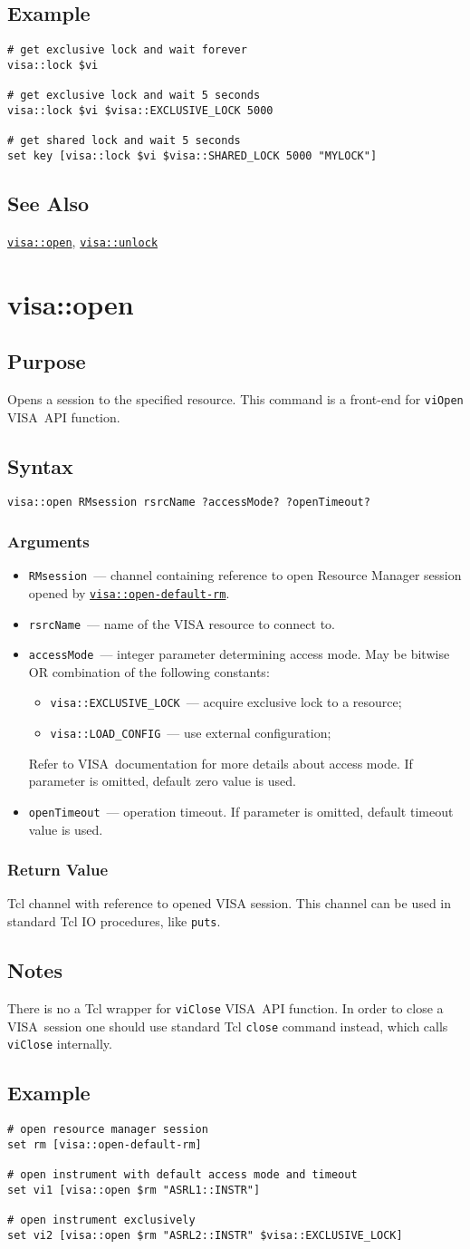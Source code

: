 \documentclass[12pt, a4paper]{report}
\newcommand{\VISA}{\mbox{VISA }}
\newcommand{\COMMANDREF}[1]{{\tt \hyperref[#1]{#1}}}
\newcommand{\VISACOMMANDREF}[1]{{\tt \mbox{#1}}\index{#1}}
\newcommand{\TCLCOMMANDREF}[1]{{\tt \mbox{#1}}\index{#1}}
\newcommand{\SEEALSO}{\subsection*{See Also}}
\newcommand{\EXAMPLE}{\subsection*{Example}}
\newcommand{\PURPOSE}{\subsection*{Purpose}}
\newcommand{\SYNTAX}[1]{\subsection*{Syntax}{\tt #1}}
\newcommand{\NOTES}{\subsection*{Notes}}
\newcommand{\ARGUMENTS}{\subsubsection*{Arguments}}
\newcommand{\RETURN}{\subsubsection*{Return Value}}
\newcommand{\COMMAND}[1]{\section{#1}\label{#1}}
\newcommand{\BEGINARGUMENTS}{\ARGUMENTS\begin{itemize}}
\newcommand{\ENDARGUMENTS}{\end{itemize}}
\newcommand{\ARGUMENT}[1]{\item {\tt \mbox{#1}}~---}
\newcommand{\ARGRM}{\ARGUMENT{RMsession} channel containing reference to open Resource Manager session opened by \COMMANDREF{visa::open-default-rm}.}
\begin{document}
\EXAMPLE

\begin{verbatim} 
# get exclusive lock and wait forever
visa::lock $vi

# get exclusive lock and wait 5 seconds
visa::lock $vi $visa::EXCLUSIVE_LOCK 5000

# get shared lock and wait 5 seconds
set key [visa::lock $vi $visa::SHARED_LOCK 5000 "MYLOCK"]
\end{verbatim} 

\SEEALSO

\COMMANDREF{visa::open}, \COMMANDREF{visa::unlock}


\COMMAND{visa::open}

\PURPOSE

Opens a session to the specified resource. This command is a front-end for \VISACOMMANDREF{viOpen} \VISA API function.

\SYNTAX{visa::open RMsession rsrcName ?accessMode? ?openTimeout?}

\BEGINARGUMENTS
\ARGRM
\ARGUMENT{rsrcName} name of the VISA resource to connect to.
\ARGUMENT{accessMode} integer parameter determining access mode. May be bitwise OR combination of the following constants:
	\begin{itemize}
	\item {\tt visa::EXCLUSIVE\_LOCK}~--- acquire exclusive lock to a resource;
	\item {\tt visa::LOAD\_CONFIG}~--- use external configuration;
	\end{itemize}
	Refer to \VISA documentation for more details about access mode. If parameter is omitted, default zero value is used.
\ARGUMENT{openTimeout} operation timeout. If parameter is omitted, default timeout value is used.
\ENDARGUMENTS

\RETURN

Tcl channel with reference to opened VISA session. This channel can be used in standard Tcl IO procedures, like \TCLCOMMANDREF{puts}.

\NOTES

There is no a Tcl wrapper for \VISACOMMANDREF{viClose} \VISA API function. In order to close a \VISA session one should use standard Tcl \TCLCOMMANDREF{close} command instead, which calls \VISACOMMANDREF{viClose} internally.

\EXAMPLE

\begin{verbatim} 
# open resource manager session
set rm [visa::open-default-rm]

# open instrument with default access mode and timeout
set vi1 [visa::open $rm "ASRL1::INSTR"]

# open instrument exclusively
set vi2 [visa::open $rm "ASRL2::INSTR" $visa::EXCLUSIVE_LOCK]
\end{verbatim} 
\end{document}
